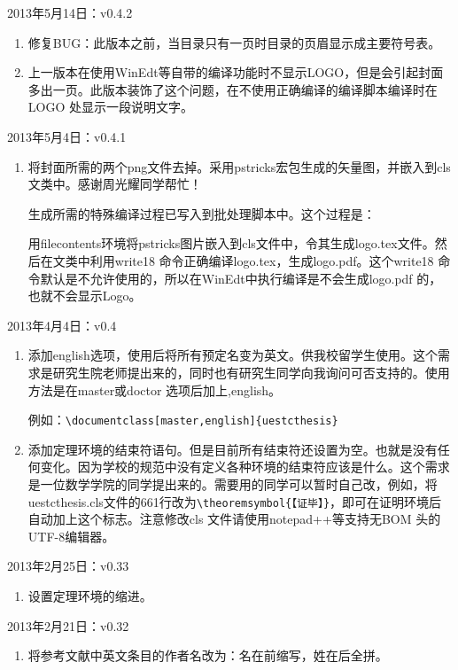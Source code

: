 \noindent
2013年5月14日：v0.4.2
\begin{enumerate}
\item 修复BUG：此版本之前，当目录只有一页时目录的页眉显示成主要符号表。
\item 上一版本在使用WinEdt等自带的编译功能时不显示LOGO，但是会引起封面多出一页。此版本装饰了这个问题，在不使用正确编译的编译脚本编译时在LOGO 处显示一段说明文字。

\end{enumerate}

\noindent
2013年5月4日：v0.4.1
\begin{enumerate}
\item 将封面所需的两个png文件去掉。采用pstricks宏包生成的矢量图，并嵌入到cls文类中。感谢周光耀同学帮忙！

生成所需的特殊编译过程已写入到批处理脚本中。这个过程是：

用filecontents环境将pstricks图片嵌入到cls文件中，令其生成logo.tex文件。然后在文类中利用write18 命令正确编译logo.tex，生成logo.pdf。这个write18 命令默认是不允许使用的，所以在WinEdt中执行编译是不会生成logo.pdf 的，也就不会显示Logo。

\end{enumerate}

\noindent
2013年4月4日：v0.4
\begin{enumerate}
\item 添加english选项，使用后将所有预定名变为英文。供我校留学生使用。这个需求是研究生院老师提出来的，同时也有研究生同学向我询问可否支持的。使用方法是在master或doctor 选项后加上,english。

    例如：\verb|\documentclass[master,english]{uestcthesis}|
\item 添加定理环境的结束符语句。但是目前所有结束符还设置为空。也就是没有任何变化。因为学校的规范中没有定义各种环境的结束符应该是什么。这个需求是一位数学学院的同学提出来的。需要用的同学可以暂时自己改，例如，将uestcthesis.cls文件的661行改为\verb|\theoremsymbol{【证毕】}|，即可在证明环境后自动加上这个标志。注意修改cls 文件请使用notepad++等支持无BOM 头的UTF-8编辑器。
\end{enumerate}

\noindent
2013年2月25日：v0.33
\begin{enumerate}
\item 设置定理环境的缩进。
\end{enumerate}


\noindent
2013年2月21日：v0.32
\begin{enumerate}
\item 将参考文献中英文条目的作者名改为：名在前缩写，姓在后全拼。
\end{enumerate}

